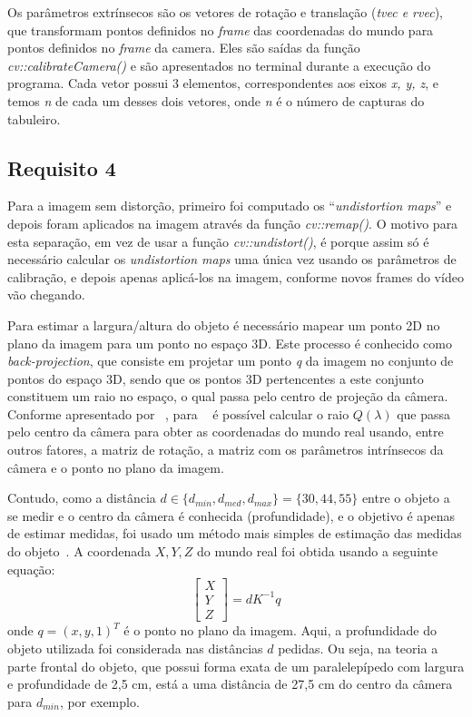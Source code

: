 \documentclass{bmvc2k}
\begin{document}
Os parâmetros extrínsecos são os vetores de rotação e translação (\textit{tvec e rvec}), que transformam pontos definidos no \textit{frame} das coordenadas do mundo para pontos definidos no \textit{frame} da camera. Eles são saídas da função \textit{cv::calibrateCamera()} e são apresentados no terminal durante a execução do programa. Cada vetor possui 3 elementos, correspondentes aos eixos \textit{x, y, z}, e temos \textit{n} de cada um desses dois vetores, onde \textit{n} é o número de capturas do tabuleiro.

\subsection{Requisito 4}
\label{Met:Req4}
Para a imagem sem distorção, primeiro foi computado os ``\textit{undistortion maps}'' e depois foram aplicados na imagem através da função \textit{cv::remap()}. O motivo para esta separação, em vez de usar a função \textit{cv::undistort()}, é porque assim só é necessário calcular os \textit{undistortion maps} uma única vez usando os parâmetros de calibração, e depois apenas aplicá-los na imagem, conforme novos frames do vídeo vão chegando. 

Para estimar a largura/altura do objeto é necessário mapear um ponto 2D no plano da imagem para um ponto no espaço 3D. Este processo é conhecido como \textit{back-projection}, que consiste em projetar um ponto \textit{q} da imagem no conjunto de pontos do espaço 3D, sendo que os pontos 3D pertencentes a este conjunto constituem um raio no espaço, o qual passa pelo centro de projeção da câmera. Conforme apresentado por ~\cite{relatoriomoodle}, para ~\cite{phdcoord} é possível calcular o raio $Q(\lambda)$ que passa pelo centro da câmera para obter as coordenadas do mundo real usando, entre outros fatores, a matriz de rotação, a matriz com os parâmetros intrínsecos da câmera e o ponto no plano da imagem.

Contudo, como a distância $d \in \{d_{min}, d_{med}, d_{max}\} = \{30, 44, 55\}$ entre o objeto a se medir e o centro da câmera é conhecida (profundidade), e o objetivo é apenas de estimar medidas, foi usado um método mais simples de estimação das medidas do objeto~\cite{webpage}. A coordenada $X, Y, Z$ do mundo real foi obtida usando a seguinte equação: \begin{equation}
\begin{bmatrix}
X \\
Y \\
Z 
\end{bmatrix} = dK^{-1}q 
\end{equation} onde $q = (x, y, 1)^{T}$ é o ponto no plano da imagem. Aqui, a profundidade do objeto utilizada foi considerada nas distâncias $d$ pedidas. Ou seja, na teoria a parte frontal do objeto, que possui forma exata de um paralelepípedo com largura e profundidade de 2,5 cm, está a uma distância de 27,5 cm do centro da câmera para $d_{min}$, por exemplo. 
\end{document}
